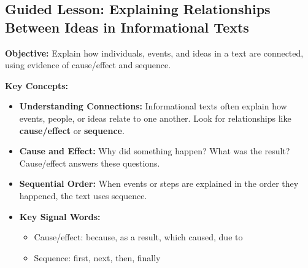 \documentclass[12pt]{article}
\begin{document}
\subsection*{Guided Lesson: Explaining Relationships Between Ideas in Informational Texts}
\onehalfspacing

\begin{tcolorbox}[colframe=black!40, colback=gray!5, 
coltitle=black, colbacktitle=black!20, fonttitle=\bfseries\Large, 
title=Learning Objective, halign title=center, left=5pt, right=5pt, top=5pt, bottom=15pt]
\textbf{Objective:} Explain how individuals, events, and ideas in a text are connected, using evidence of cause/effect and sequence.
\end{tcolorbox}

\vspace{1em}

\begin{tcolorbox}[colframe=black!60, colback=white, 
coltitle=black, colbacktitle=black!15, fonttitle=\bfseries\Large, 
title=Key Concepts and Vocabulary, halign title=center, left=10pt, right=10pt, top=10pt, bottom=15pt]
\textbf{Key Concepts:}
\begin{itemize}
    \item \textbf{Understanding Connections:} Informational texts often explain how events, people, or ideas relate to one another. Look for relationships like \textbf{cause/effect} or \textbf{sequence}.
    \item \textbf{Cause and Effect:} Why did something happen? What was the result? Cause/effect answers these questions.
    \item \textbf{Sequential Order:} When events or steps are explained in the order they happened, the text uses sequence.
    \item \textbf{Key Signal Words:}
    \begin{itemize}
        \item Cause/effect: because, as a result, which caused, due to
        \item Sequence: first, next, then, finally
    \end{itemize}
\end{itemize}
\end{tcolorbox}

\vspace{1em}
\end{document}
